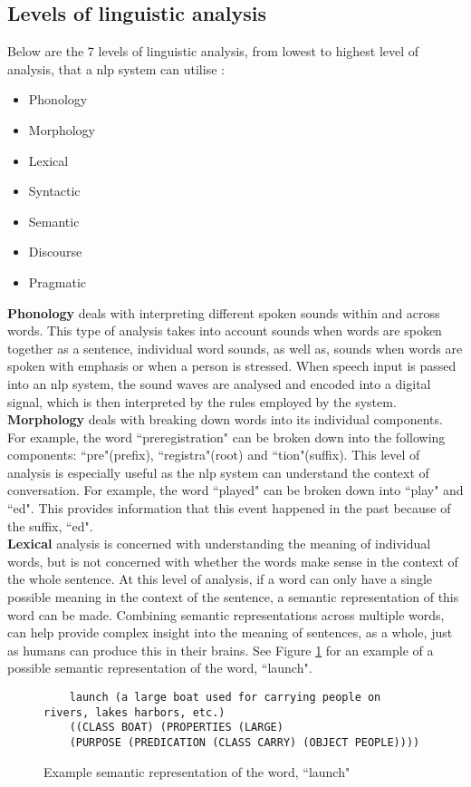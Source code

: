 \subsection{Levels of linguistic analysis}
Below are the 7 levels of linguistic analysis, from lowest to highest level of analysis, that a \gls{nlp} system can utilise \autocite{liddy2001natural}:
\begin{itemize}
	\item Phonology
	\item Morphology
	\item Lexical
	\item Syntactic
	\item Semantic
	\item Discourse
	\item Pragmatic
\end{itemize}
\textbf{Phonology} deals with interpreting different spoken sounds within and across words. This type of analysis takes into account sounds when words are spoken together as a sentence, individual word sounds, as well as, sounds when words are spoken with emphasis or when a person is stressed. When speech input is passed into an \gls{nlp} system, the sound waves are analysed and encoded into a digital signal, which is then interpreted by the rules employed by the system.\\
\textbf{Morphology} deals with breaking down words into its individual components. For example, the word ``preregistration" can be broken down into the following components: ``pre"(prefix), ``registra"(root) and ``tion"(suffix). This level of analysis is especially useful as the \gls{nlp} system can understand the context of conversation. For example, the word ``played" can be broken down into ``play" and ``ed". This provides information that this event happened in the past because of the suffix, ``ed".\\
\textbf{Lexical} analysis is concerned with understanding the meaning of individual words, but is not concerned with whether the words make sense in the context of the whole sentence. At this level of analysis, if a word can only have a single possible meaning in the context of the sentence, a semantic representation of this word can be made. Combining semantic representations across multiple words, can help provide complex insight into the meaning of sentences, as a whole, just as humans can produce this in their brains. See Figure \ref{fig:semantic-rep-nlp} for an example of a possible semantic representation of the word, ``launch".
\begin{figure}[H]
	\centering
	\hspace*{-2cm} 
	\begin{BVerbatim}
	launch (a large boat used for carrying people on rivers, lakes harbors, etc.)
	((CLASS BOAT) (PROPERTIES (LARGE)
	(PURPOSE (PREDICATION (CLASS CARRY) (OBJECT PEOPLE)))) 
	\end{BVerbatim}
	
	\caption{Example semantic representation of the word, ``launch" \autocite{liddy2001natural}}
	\label{fig:semantic-rep-nlp}
\end{figure}

